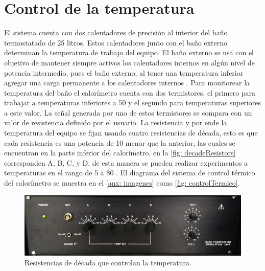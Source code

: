 
%




\chapter{Control de la temperatura}\label{ch: thermal}
	El sistema cuenta con dos calentadores de precisión al interior del baño termostatado de 25 litros. Estos calentadores junto con el ba\~no externo determinan la temperatura de trabajo del equipo. El ba\~no externo se usa con el objetivo de mantener siempre activos los calentadores internos en alg\'un nivel de potencia intermedio, pues el ba\~no externo, al tener una temperatura inferior agregar una carga permanente a los calentadores internos \cite{Suurkuusk}. Para monitorear la temperatura del ba\~no el calor\'imetro cuenta con dos termistores, el primero para trabajar a temperaturas inferiores a 50 \grad{} y el segundo para temperaturas superiores a este valor. La se\~nal generada por uno de estos termistores se compara con un valor de resistencia definido por el usuario. La resistencia y por ende la temperatura del equipo se fijan usando cuatro resistencias de década, esto es que cada resistencia es una potencia de 10 menor que la anterior, las cuales se encuentran en la parte inferior del calor\'imetro, en la \autoref{fig: decadeResistors} corresponden A, B, C, y D, de esta manera se pueden realizar experimentos a temperaturas en el rango de 5 a 80 \grad{}. El diagrama del sistema de control t\'ermico del calor\'imetro se muestra en el \autoref{anx: imagenes} como \autoref{fig: controlTermico}.
	
	\begin{figure}[h]
		\centering
		\includegraphics[width=0.7\linewidth]{Figures/decadeResistors}
		\caption{Resistencias de década que controlan la temperatura.}
		\label{fig: decadeResistors}
	\end{figure}
	
